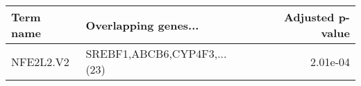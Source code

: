 \begin{tabular}{llr}
\toprule
Term name &        Overlapping genes... &  Adjusted p-value \\
\midrule
NFE2L2.V2 & SREBF1,ABCB6,CYP4F3,...(23) &          2.01e-04 \\
\bottomrule
\end{tabular}
